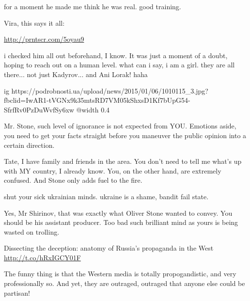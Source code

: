 \begin{itemize}
\begin{itemize}

for a moment he made me think he was real. good training.


Vira, this says it all:

\url{http://prntscr.com/5oyau9}


i checked him all out beforehand, I know. It was just a moment of a doubt,
hoping to reach out on a human level. what can i say, i am a girl. they are all
there... not just Kadyrov... and Ani Lorak! haha


\ifcmt
  ig https://podrobnosti.ua/upload/news/2015/01/06/1010115_3.jpg?fbclid=IwAR1-tVGNx9k35mtsRD7VM05kShxsD1Kf7bUpG54-SfrfRv0PzDuWvfSy6xw
  @width 0.4
\fi

\end{itemize} %


Mr. Stone, such level of ignorance is not expected from YOU. Emotions aside,
you need to get your facts straight before you maneuver the public opinion into
a certain direction.

\begin{itemize} %

Tate, I have family and friends in the area. You don't need to tell me what's
up with MY country, I already know. You, on the other hand, are extremely
confused. And Stone only adds fuel to the fire.


shut your sick ukrainian minds. ukraine is a shame, bandit fail state.


Yes, Mr Shirinov, that was exactly what Oliver Stone wanted to convey. You
should be his assistant producer. Too bad such brilliant mind as yours is being
wasted on trolling.

\end{itemize} %


Dissecting the deception: anatomy of Russia’s propaganda in the West
\url{http://t.co/hRxIGCY01F}

\begin{itemize} %

The funny thing is that the Western media is totally propogandistic, and very
professionally so. And yet, they are outraged, outraged that anyone else could
be partisan!


\end{itemize}
\end{itemize}
